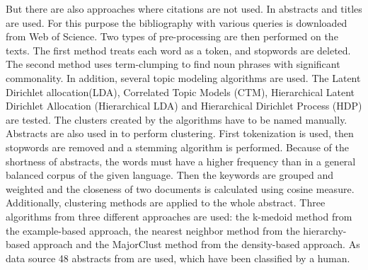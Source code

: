 But there are also approaches where citations are not used.
In \cite{Clustering_scientific_documents_with_topic_modeling} abstracts and titles are used.
For this purpose the bibliography with various queries is downloaded from Web of Science\cite{web_of_science}.  
Two types of pre-processing are then performed on the texts. The first method treats each word as a token, and stopwords are deleted. The second method uses term-clumping to find noun phrases with significant commonality.
In addition, several topic modeling algorithms are used. 
The Latent Dirichlet allocation(LDA), Correlated Topic Models (CTM), Hierarchical Latent Dirichlet Allocation (Hierarchical LDA) and Hierarchical Dirichlet Process (HDP) are tested.
The clusters created by the algorithms have to be named manually.
Abstracts are also used in \cite{An_Approach_to_Clustering_Abstracts} to perform clustering.
First tokenization is used, then stopwords are removed and a stemming algorithm is performed.
Because of the shortness of abstracts, the words must have a higher frequency than in a general balanced corpus of the given language. Then the keywords are grouped and weighted and the closeness of two documents is calculated using cosine measure. 
Additionally, clustering methods are applied to the whole abstract. Three algorithms from three different approaches are used: the k-medoid method from the example-based approach, the nearest neighbor method from the hierarchy-based approach and the MajorClust method from the density-based approach.
As data source 48 abstracts from \cite{cicling} are used, which have been classified by a human.